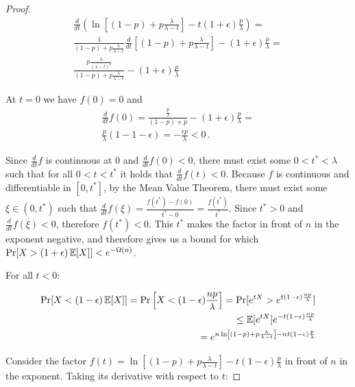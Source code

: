 \begin{proof}
  \begin{align*}
    \frac{d}{dt} \left(\ln\left[(1 - p) + p\frac{\lambda}{\lambda - t}\right] - t(1 + \epsilon)\frac{p}{\lambda}\right) = \\
    \frac{1}{(1 - p) + p\frac{\lambda}{\lambda - t}} \frac{d}{dt} \left[(1 - p) + p\frac{\lambda}{\lambda - t}\right] - (1 + \epsilon)\frac{p}{\lambda} = \\
    \frac{p\frac{\lambda}{(\lambda - t)^2}}{(1 - p) + p\frac{\lambda}{\lambda - t}} - (1 + \epsilon)\frac{p}{\lambda}
  \end{align*}

  At $t = 0$ we have $f(0) = 0$ and
  \begin{align*}
    \frac{d}{dt} f(0) = \frac{\frac{p}{\lambda}}{(1 - p) + p} - (1 + \epsilon)\frac{p}{\lambda} =\\
    \frac{p}{\lambda}(1 - 1 - \epsilon) = -\frac{\epsilon p}{\lambda} < 0\,.
  \end{align*}

  Since $\frac{d}{dt} f$ is continuous at $0$ and $\frac{d}{dt} f(0) < 0$, there must exist some $0 < t^* < \lambda$ such that for all
  $0 < t < t^*$ it holds that $\frac{d}{dt} f(t) < 0$. Because $f$ is continuous and differentiable in $[0, t^*]$,
  by the Mean Value Theorem, there must exist some $\xi \in (0, t^*)$ such that
  $\frac{d}{dt} f(\xi) = \frac{f(t^*) - f(0)}{t^* - 0} = \frac{f(t^*)}{t^*}$.
  Since $t^* > 0$ and $\frac{d}{dt} f(\xi) < 0$, therefore $f(t^*) < 0$.
  This $t^*$ makes the factor in front of $n$ in the exponent negative, and therefore
  gives us a bound for which $\Pr[X > (1 + \epsilon)\mathop{{}\mathbb{E}}[X]] < e^{-\Omega(n)}$.

  For all $t < 0$:

  \begin{align*}
    \Pr[X < (1 - \epsilon)\mathop{{}\mathbb{E}}[X]] = \Pr\left[X < (1 - \epsilon)\frac{np}{\lambda}\right] = \Pr[e^ {tX} > e^{t(1 - \epsilon)\frac{np}{\lambda}}]\\
    \leq \mathop{{}\mathbb{E}}[e^{tX}] e^{-t(1 - \epsilon)\frac{np}{\lambda}} \\
    = e^{n \ln\left[(1 - p) + p\frac{\lambda}{\lambda - t}\right] - n t(1 - \epsilon)\frac{p}{\lambda}}
  \end{align*}

  Consider the factor
  $f(t) = \ln\left[(1 - p) + p\frac{\lambda}{\lambda - t}\right] - t(1 - \epsilon)\frac{p}{\lambda}$
  in front of $n$ in the exponent. Taking its derivative with respect to $t$:


\end{proof}
